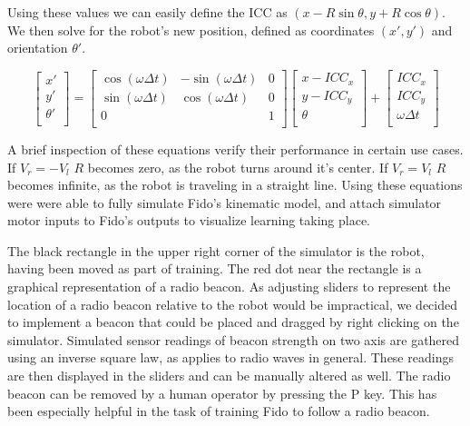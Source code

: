 Using these values we can easily define the ICC as $(x - R\sin\theta,y + R\cos\theta)$.  We then solve for the robot's new position, defined as coordinates $(x',y')$ and orientation $\theta'$.

\begin{equation}
	\begin{bmatrix}
	    x'      \\
	    y'      \\
	    \theta' \\
	\end{bmatrix} =
	\begin{bmatrix}
		\cos(\omega\Delta t) & -\sin(\omega\Delta t) & 0 \\
		\sin(\omega\Delta t) & \cos(\omega\Delta t)  & 0 \\
		0                    &                       & 1 \\
	\end{bmatrix}
	\begin{bmatrix}
		x - ICC_x  \\
		y - ICC_y  \\
		\theta     \\
	\end{bmatrix} + 
	\begin{bmatrix}
		ICC_x          \\
		ICC_y          \\
		\omega\Delta t \\
	\end{bmatrix}
\end{equation}

A brief inspection of these equations verify their performance in certain use cases.  If $V_r = -V_l$ $R$ becomes zero, as the robot turns around it's center.  If $V_r = V_l$ $R$ becomes infinite, as the robot is traveling in a straight line.  Using these equations were were able to fully simulate Fido's kinematic model, and attach simulator motor inputs to Fido's outputs to visualize learning taking place.   

The black rectangle in the upper right corner of the simulator is the robot, having been moved as part of training.  The red dot near the rectangle is a graphical representation of a radio beacon.  As adjusting sliders to represent the location of a radio beacon relative to the robot would be impractical, we decided to implement a beacon that could be placed and dragged by right clicking on the simulator.  Simulated sensor readings of beacon strength on two axis are gathered using an inverse square law, as applies to radio waves in general.  These readings are then displayed in the sliders and can be manually altered as well.  The radio beacon can be removed by a human operator by pressing the P key.  This has been especially helpful in the task of training Fido to follow a radio beacon.
